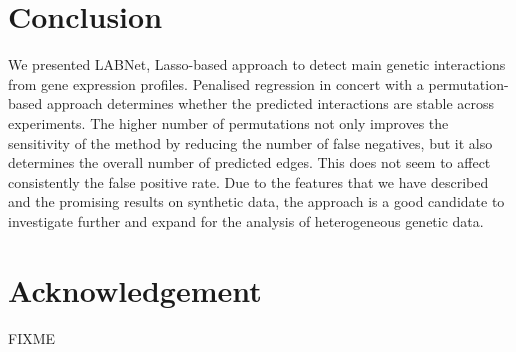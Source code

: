 \section{Conclusion} \label{conclusion}
We presented LABNet, Lasso-based approach to detect main genetic interactions from gene expression profiles.  Penalised regression in concert with a permutation-based approach determines whether the predicted interactions are stable across experiments. 
The higher number of permutations not only improves the sensitivity of the method by reducing the number of false negatives, but it also determines the overall number of predicted edges. This does not seem to affect consistently the false positive rate. Due to the features that we have described and the promising results on synthetic data, the approach is a good candidate to investigate further and expand for the analysis of heterogeneous genetic data. 

\section*{Acknowledgement}
FIXME